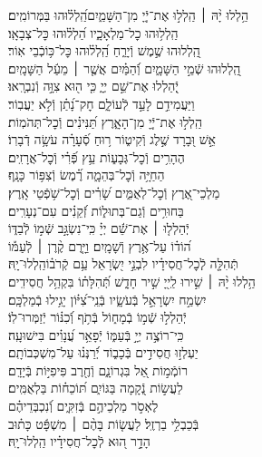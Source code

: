 \documentclass[twoside, openany, parskip=half, 11pt]{book}
\begin{document}
\begin{narrow}
הַ֥לְלוּ יָ֨הּ ׀ \hfill \break
הַֽלְל֣וּ אֶת־יְֿיָ֭ מִן־הַשָּׁמַ֑יִם\hfill הַֽ֝לְל֗וּהוּ בַּמְּרוֹמִֽים׃ \\
הַֽלְל֥וּהוּ כׇל־מַלְאָכָ֑יו \hfill הַ֝לְל֗וּהוּ כׇּל־צְבָאָֽו׃ \\
הַֽ֭לְלוּהוּ שֶׁ֣מֶשׁ וְֿיָרֵ֑חַ \hfill הַֽ֝לְל֗וּהוּ כׇּל־כּ֥וֹכְֿבֵי אֽוֹר׃ \\
הַֽ֭לְלוּהוּ שְֿׁמֵ֣י הַשָּׁמָ֑יִם \hfill וְֿ֝הַמַּ֗יִם אֲשֶׁ֤ר ׀ מֵעַ֬ל הַשָּׁמָֽיִם׃ \\
יְֽֿ֭הַלְלוּ אֶת־שֵׁ֣ם יְיָ֑ \hfill כִּ֤י ה֖וּא צִוָּ֣ה וְֿנִבְרָֽאוּ׃ \\
וַיַּעֲמִידֵ֣ם לָעַ֣ד לְֿעוֹלָ֑ם \hfill חׇק־נָ֝תַ֗ן וְֿלֹ֣א יַעֲבֽוֹר׃ \\
הַֽלְל֣וּ אֶת־יְֿיָ֭ מִן־הָאָ֑רֶץ \hfill תַּ֝נִּינִ֗ים וְֿכׇל־תְּהֹמֽוֹת׃ \\
אֵ֣שׁ וּ֭בָרָד שֶׁ֣לֶג וְֿקִיט֑וֹר \hfill ר֥וּחַ סְֿ֝עָרָ֗ה עֹשָׂ֥ה דְֿבָרֽוֹ׃ \\
הֶהָרִ֥ים וְֿכׇל־גְּבָע֑וֹת \hfill עֵ֥ץ פְּֿ֝רִ֗י וְֿכׇל־אֲרָזִֽים׃ \\
הַחַיָּ֥ה וְֿכׇל־בְּהֵמָ֑ה \hfill רֶ֗֝מֶשׂ וְֿצִפּ֥וֹר כָּנָֽף׃ \\
מַלְכֵי־אֶ֭רֶץ וְֿכׇל־לְאֻמִּ֑ים \hfill שָׂ֝רִ֗ים וְֿכׇל־שֹׁ֥פְֿטֵי אָֽרֶץ׃ \\
בַּחוּרִ֥ים וְֿגַם־בְּתוּל֑וֹת \hfill זְֿ֝קֵנִ֗ים עִם־נְעָרִֽים׃ \\
יְֿהַלְל֤וּ ׀ אֶת־שֵׁ֬ם יְיָ֗ \hfill כִּֽי־נִשְׂגָּ֣ב שְֿׁמ֣וֹ לְֿבַדּ֑וֹ\\ ה֝וֹד֗וֹ עַל־אֶ֥רֶץ וְֿשָׁמָֽיִם׃ \hfill
וַיָּ֤רֶם קֶ֨רֶן ׀ לְֿעַמּ֡וֹ\\ תְּֿהִלָּ֤ה לְֽֿכׇל־חֲסִידָ֗יו לִבְנֵ֣י יִ֭שְׂרָאֵל עַ֥ם קְֿרֹב֗וֹ\hfill הַֽלְלוּ־יָֽהּ׃ \\

הַ֥לְלוּ יָ֨הּ ׀ \hfill \break
שִׁ֣ירוּ לַֽייָ֭ שִׁ֣יר חָדָ֑שׁ \hfill תְּֿ֝הִלָּת֗וֹ בִּקְהַ֥ל חֲסִידִֽים׃ \\
יִשְׂמַ֣ח יִשְׂרָאֵ֣ל בְּֿעֹשָׂ֑יו \hfill בְּֿנֵֽי־צִ֝יּ֗וֹן יָגִ֥ילוּ בְֿמַלְכָּֽם׃ \\
יְֿהַלְל֣וּ שְֿׁמ֣וֹ בְֿמָח֑וֹל \hfill בְּֿתֹ֥ף וְֿ֝כִנּ֗וֹר יְֿזַמְּרוּ־לֽוֹ׃ \\
כִּֽי־רוֹצֶ֣ה יְיָ֣ בְּֿעַמּ֑וֹ \hfill יְֿפָאֵ֥ר עֲ֝נָוִ֗ים בִּישׁוּעָֽה׃ \\
יַעְלְז֣וּ חֲסִידִ֣ים בְּֿכָב֑וֹד \hfill יְֿ֝רַנְּנ֗וּ עַל־מִשְׁכְּבוֹתָֽם׃ \\
רוֹמְֿמ֣וֹת אֵ֭ל בִּגְרוֹנָ֑ם \hfill וְֿחֶ֖רֶב פִּיפִיּ֣וֹת בְּֿיָדָֽם׃ \\
לַעֲשׂ֣וֹת נְֿ֭קָמָה בַּגּוֹיִ֑ם \hfill תּ֝וֹכֵח֗וֹת בַּלְאֻמִּֽים׃ \\
לֶאְסֹ֣ר מַלְכֵיהֶ֣ם בְּֿזִקִּ֑ים \hfill וְֿ֝נִכְבְּדֵיהֶ֗ם\\ בְּֿכַבְלֵ֥י בַרְזֶֽל׃ \hfill
לַעֲשׂ֤וֹת בָּהֶ֨ם ׀ מִשְׁפָּ֬ט כָּת֗וּב\\ הָדָ֣ר ה֭וּא לְֿכׇל־חֲסִידָ֗יו \hfill הַֽלְלוּ־יָֽהּ׃ \\



\end{narrow}
\end{document}
